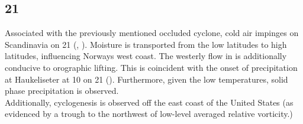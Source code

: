\subsection*{\SI{21}{\dec}}
Associated with the previously mentioned occluded cyclone, cold air impinges on Scandinavia on \SI{21}{\dec} (, ). Moisture is transported from the low latitudes to high latitudes, influencing Norways west coast. The westerly flow in  is additionally conducive to orographic lifting. This is coincident with the onset of precipitation at Haukeliseter at \SI{10}{\UTC} on \SI{21}{\dec} (). Furthermore, given the low temperatures, solid phase precipitation is observed.
\\
Additionally, cyclogenesis is observed off the east coast of the United States (as evidenced by a trough to the northwest of low-level averaged relative vorticity.) 
